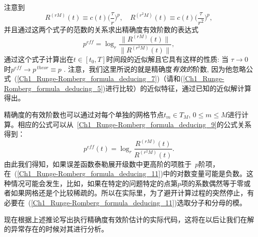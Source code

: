 \documentclass[twoside]{book}
\begin{document}
\begin{CJK*}{GBK}{song}
注意到
\begin{equation}
    \label{Ch1_Runge-Romberg_formula_deducing_9}
    R^{(rM)}(t) \equiv c(t) \Big(\frac{\tau}{r}\Big)^p, \quad R^{(r^2M)}(t) \equiv c(t) \Big(\frac{\tau}{r^2}\Big)^p,
\end{equation}
并且通过这两个式子的范数的关系求出精确度有效阶数的表达式
\begin{equation}
    \label{Ch1_Runge-Romberg_formula_deducing_10}
    p^{eff}  = \log_r \frac{\|R^{(rM)}(t)\|}{\|R^{(r^2M)}(t)\|},
\end{equation}
通过这个式子计算出在$t \in [t_0,T]$时间段的近似解且它具有这样的性质: 当 $\tau \to 0$时$p^{eff} \to p^{\, theor} \equiv p$ . 注意，我们这里所说的就是精确度\emph{有效的}阶数, 因为他忽略公式~(\ref{Ch1_Runge-Romberg_formula_deducing_7})（请和(\ref{Ch1_Runge-Romberg_formula_deducing_5})进行比较）的近似特征，通过已知的近似解计算得出。

精确度的有效阶数也可以通过对每个单独的网格节点$t_m \in T_M$, $0 \leqslant m \leqslant M$进行计算。相应的公式可以从~\eqref{Ch1_Runge-Romberg_formula_deducing_9}的公式关系得到：
\begin{equation}
    \label{Ch1_Runge-Romberg_formula_deducing_11}
    p^{eff}(t)  = \log_r \frac{R^{(rM)}(t)}{R^{(r^2M)}(t)}.
\end{equation}
由此我们得知，如果误差函数泰勒展开级数中更高阶的项胜于~$p$阶项，在~(\ref{Ch1_Runge-Romberg_formula_deducing_11})中的对数变量可能是负数。这种情况可能会发生，比如，如果在特定的问题特定的点第$p$项的系数偶然等于零或者如果网格还是个比较稀疏的。所以在实际里，为了避开计算过程的突然停止，有必要在~(\ref{Ch1_Runge-Romberg_formula_deducing_11})选取分子和分母的模。

现在根据上述推论写出执行精确度有效阶估计的实际代码，这将在以后让我们在解的异常存在的时候对其进行分析。


\end{CJK*}
\end{document}
